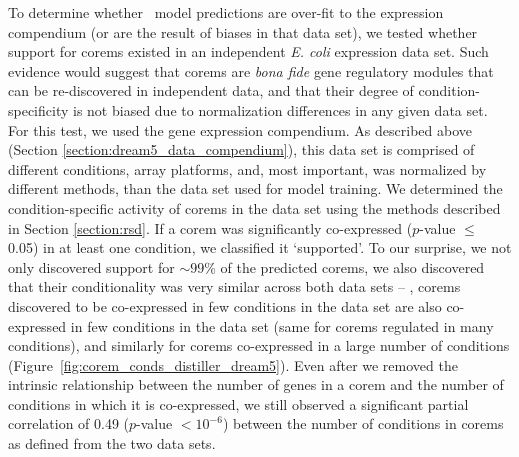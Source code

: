 To determine whether \egrine\ model predictions are over-fit to
the  expression compendium (or are the result of
biases in that data set), we tested whether support for corems existed
in an independent {\it E. coli} expression data set. Such evidence
would suggest that corems are \textit{bona fide} gene regulatory
modules that can be re-discovered in independent data, and that their
degree of condition-specificity is not biased due to normalization
differences in any given data set. For this test, we used
the  gene expression compendium. As described above
(Section \ref{section:dream5_data_compendium}), this data set is
comprised of different conditions, array platforms, and, most
important, was normalized by different methods, than
the  data set used for model training. We determined
the condition-specific activity of corems in the  data
set using the methods described in Section \ref{section:rsd}. If a
corem was significantly co-expressed ($p$-value $\leq$ 0.05) in at
least one condition, we classified it `supported'. To our surprise, we
not only discovered support for $\sim 99$\% of the predicted corems,
we also discovered that their conditionality was very similar across
both data sets -- \ie, corems discovered to be co-expressed in few
conditions in the  data set are also co-expressed in
few conditions in the  data set (same for corems
regulated in many conditions), and similarly for corems co-expressed
in a large number of conditions (Figure~\ref{fig:corem_conds_distiller_dream5}).
Even after we removed the intrinsic relationship between the number of
genes in a corem and the number of conditions in which it is
co-expressed, we still observed a significant partial correlation of
0.49 ($p$-value $< 10^{-6}$) between the number of conditions in
corems as defined from the two data sets. 

